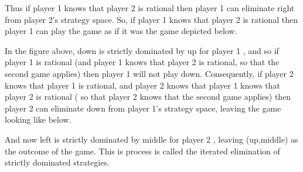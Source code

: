 Thus if player 1 knows that player 2 is rational then player 1 can eliminate right from player 2's strategy space. So, if player 1 knows that player 2 is rational then player 1 can play the game as if it was the game depicted below.


In the figure above, down is strictly dominated by up for player 1 , and so if player 1 is rational (and player 1 knows that player 2 is rational, so that the second game applies) then player 1 will not play down. Consequently, if player 2 knows that player 1 is rational, and player 2 knows that player 1 knows that player 2 is rational ( so that player 2 knows that the second game applies) then player 2 can eliminate down from player 1's strategy space, leaving the game looking like below.


And now left is strictly dominated by middle for player 2 , leaving (up,middle) as the outcome of the game. This is process is called the iterated elimination of strictly dominated strategies.
